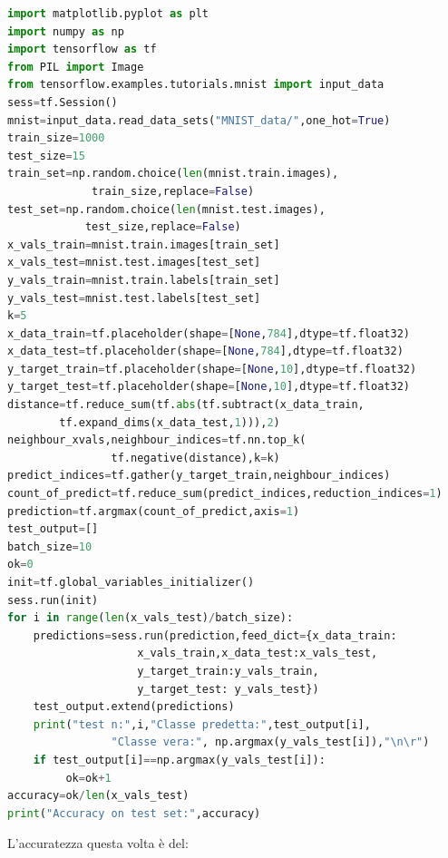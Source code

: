 \documentclass[a4paper,12pt]{report}
\begin{document}
\begin{lstlisting}[language={Python},tabsize=2]
import matplotlib.pyplot as plt
import numpy as np
import tensorflow as tf
from PIL import Image
from tensorflow.examples.tutorials.mnist import input_data
sess=tf.Session()
mnist=input_data.read_data_sets("MNIST_data/",one_hot=True)
train_size=1000
test_size=15
train_set=np.random.choice(len(mnist.train.images),
			 train_size,replace=False)
test_set=np.random.choice(len(mnist.test.images),
			test_size,replace=False)
x_vals_train=mnist.train.images[train_set]
x_vals_test=mnist.test.images[test_set]
y_vals_train=mnist.train.labels[train_set]
y_vals_test=mnist.test.labels[test_set]
k=5
x_data_train=tf.placeholder(shape=[None,784],dtype=tf.float32)
x_data_test=tf.placeholder(shape=[None,784],dtype=tf.float32)
y_target_train=tf.placeholder(shape=[None,10],dtype=tf.float32)
y_target_test=tf.placeholder(shape=[None,10],dtype=tf.float32)
distance=tf.reduce_sum(tf.abs(tf.subtract(x_data_train,
		tf.expand_dims(x_data_test,1))),2)
neighbour_xvals,neighbour_indices=tf.nn.top_k(
				tf.negative(distance),k=k) 
predict_indices=tf.gather(y_target_train,neighbour_indices)
count_of_predict=tf.reduce_sum(predict_indices,reduction_indices=1)
prediction=tf.argmax(count_of_predict,axis=1)
test_output=[]
batch_size=10
ok=0
init=tf.global_variables_initializer()
sess.run(init)
for i in range(len(x_vals_test)/batch_size):
	predictions=sess.run(prediction,feed_dict={x_data_train:
					x_vals_train,x_data_test:x_vals_test,
					y_target_train:y_vals_train,
					y_target_test: y_vals_test})
    test_output.extend(predictions)
    print("test n:",i,"Classe predetta:",test_output[i],
				"Classe vera:", np.argmax(y_vals_test[i]),"\n\r")
    if test_output[i]==np.argmax(y_vals_test[i]):
         ok=ok+1
accuracy=ok/len(x_vals_test)
print("Accuracy on test set:",accuracy)
\end{lstlisting}
L'accuratezza questa volta \`{e} del:
\clearpage
{}


\nocite{deep,machine,imagenet}
\end{document}
